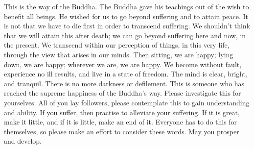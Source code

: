 This is the way of the Buddha. The Buddha gave his teachings out of the wish to benefit all beings. He wished for us to go beyond suffering and to attain peace. It is not that we have to die first in order to transcend suffering. We shouldn't think that we will attain this after death; we can go beyond suffering here and now, in the present. We transcend within our perception of things, in this very life, through the view that arises in our minds. Then sitting, we are happy; lying down, we are happy; wherever we are, we are happy. We become without fault, experience no ill results, and live in a state of freedom. The mind is clear, bright, and tranquil. There is no more darkness or defilement. This is someone who has reached the supreme happiness of the Buddha's way. Please investigate this for yourselves. All of you lay followers, please contemplate this to gain understanding and ability. If you suffer, then practise to alleviate your suffering. If it is great, make it little, and if it is little, make an end of it. Everyone has to do this for themselves, so please make an effort to consider these words. May you prosper and develop.

